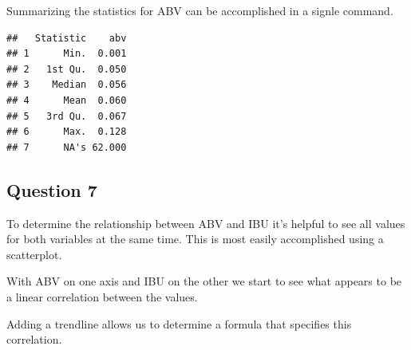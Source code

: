 \documentclass[]{article}
\newenvironment{Shaded}{\begin{snugshade}}{\end{snugshade}}
\newcommand{\KeywordTok}[1]{\textcolor[rgb]{0.13,0.29,0.53}{\textbf{#1}}}
\newcommand{\DataTypeTok}[1]{\textcolor[rgb]{0.13,0.29,0.53}{#1}}
\newcommand{\DecValTok}[1]{\textcolor[rgb]{0.00,0.00,0.81}{#1}}
\newcommand{\StringTok}[1]{\textcolor[rgb]{0.31,0.60,0.02}{#1}}
\newcommand{\CommentTok}[1]{\textcolor[rgb]{0.56,0.35,0.01}{\textit{#1}}}
\newcommand{\OperatorTok}[1]{\textcolor[rgb]{0.81,0.36,0.00}{\textbf{#1}}}
\newcommand{\NormalTok}[1]{#1}
\begin{document}
Summarizing the statistics for ABV can be accomplished in a signle
command.

\begin{Shaded}
\end{Shaded}

\begin{verbatim}
##   Statistic    abv
## 1      Min.  0.001
## 2   1st Qu.  0.050
## 3    Median  0.056
## 4      Mean  0.060
## 5   3rd Qu.  0.067
## 6      Max.  0.128
## 7      NA's 62.000
\end{verbatim}

\subsection{Question 7}\label{question-7}

To determine the relationship between ABV and IBU it's helpful to see
all values for both variables at the same time. This is most easily
accomplished using a scatterplot.

With ABV on one axis and IBU on the other we start to see what appears
to be a linear correlation between the values.

Adding a trendline allows us to determine a formula that specifies this
correlation.

\begin{Shaded}
\end{Shaded}
\end{document}
